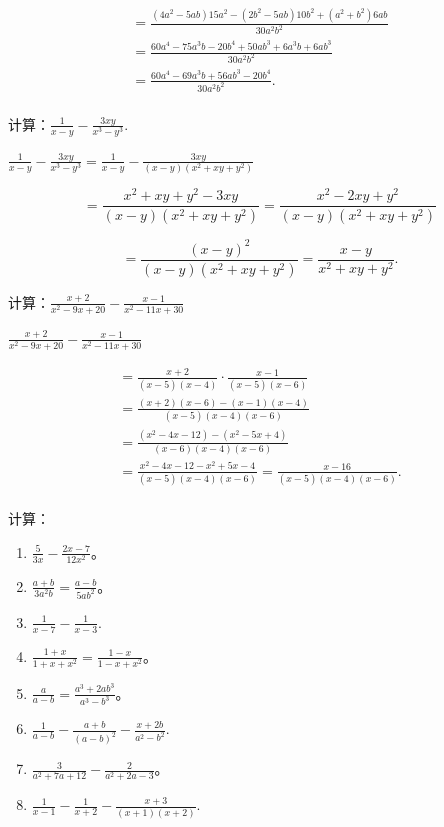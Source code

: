 \[
\begin{array}{l} = \frac{(4 a ^{2} - 5 a b) 15 a ^{2} - (2 b ^{2} - 5 a b) 10 b ^{2} + (a ^{2} + b ^{2}) 6 a b}{30 a ^{2} b ^{2}} \\ = \frac{60 a ^{4} - 75 a ^{3} b - 20 b ^{4} + 50 a b ^{3} + 6 a ^{3} b + 6 a b ^{3}}{30 a ^{2} b ^{2}} \\ = \frac{60 a ^{4} - 69 a ^{3} b + 56 a b ^{3} - 20 b ^{4}}{30 a ^{2} b ^{2}}. \\ \end{array}
\]

 计算：\(\frac{1}{x - y} -\frac{3xy}{x^3 - y^3}.\)

\(\frac{1}{x - y} -\frac{3xy}{x^3 - y^3} = \frac{1}{x - y} -\frac{3xy}{(x - y)(x^2 + xy + y^2)}\)

\[
= \frac{x ^{2} + x y + y ^{2} - 3 x y}{(x - y) (x ^{2} + x y + y ^{2})} = \frac{x ^{2} - 2 x y + y ^{2}}{(x - y) (x ^{2} + x y + y ^{2})}
\]

\[
= \frac{(x - y) ^{2}}{(x - y) (x ^{2} + x y + y ^{2})} = \frac{x - y}{x ^{2} + x y + y ^{2}}.
\]

 计算：\(\frac{x+2}{x^{2}-9x+20}-\frac{x-1}{x^{2}-11x+30}\)

\(\frac{x + 2}{x^2 - 9x + 20} - \frac{x - 1}{x^2 - 11x + 30}\)

\[
\begin{array}{l} = \frac{x + 2}{(x - 5) (x - 4)} \cdot \frac{x - 1}{(x - 5) (x - 6)} \\ = \frac{(x + 2) (x - 6) - (x - 1) (x - 4)}{(x - 5) (x - 4) (x - 6)} \\ = \frac{(x ^{2} - 4 x - 12) - (x ^{2} - 5 x + 4)}{(x - 6) (x - 4) (x - 6)} \\ = \frac{x ^{2} - 4 x - 12 - x ^{2} + 5 x - 4}{(x - 5) (x - 4) (x - 6)} = \frac{x - 16}{(x - 5) (x - 4) (x - 6)}. \\ \end{array}
\]

计算：

\begin{enumerate}[start=1]
\item
  \(\frac{5}{3x} - \frac{2x - 7}{12x^2}\)。
\item
  \(\frac{a + b}{3a^2b} = \frac{a - b}{5ab^2}\)。
\item
  \(\frac{1}{x - 7} -\frac{1}{x - 3}.\)
\item
  \(\frac{1 + x}{1 + x + x^2} = \frac{1 - x}{1 - x + x^2}\)。
\item
  \(\frac{a}{a - b} = \frac{a^3 + 2ab^3}{a^3 - b^3}\)。
\item
  \(\frac{1}{a - b} -\frac{a + b}{(a - b)^2} -\frac{x + 2b}{a^2 - b^2}.\)
\item
  \(\frac{3}{a^2 + 7a + 12} - \frac{2}{a^2 + 2a - 3}\)。
\item
  \(\frac{1}{x - 1} -\frac{1}{x + 2} -\frac{x + 3}{(x + 1)(x + 2)}.\)
\end{enumerate}

